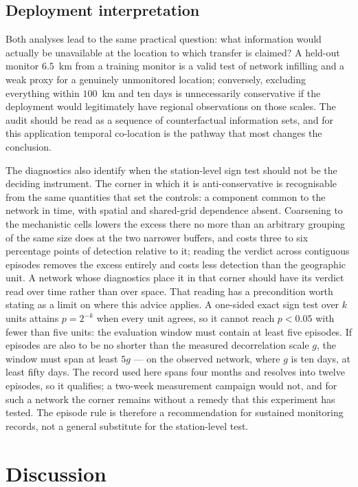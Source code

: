 \subsection{Deployment interpretation}

Both analyses lead to the same practical question: what information would actually be unavailable
at the location to which transfer is claimed? A held-out monitor $6.5$~km from a training monitor
is a valid test of network infilling and a weak proxy for a genuinely unmonitored location;
conversely, excluding everything within $100$~km and ten days is unnecessarily conservative if the
deployment would legitimately have regional observations on those scales. The audit should be read
as a sequence of counterfactual information sets, and for this application temporal co-location is
the pathway that most changes the conclusion.

The diagnostics also identify when the station-level sign test should not be the deciding
instrument. The corner in which it is anti-conservative is recognisable from the same quantities
that set the controls: a component common to the network in time, with spatial and shared-grid
dependence absent. Coarsening to the mechanistic cells lowers the excess there no more than an
arbitrary grouping of the same size does at the two narrower buffers, and costs three to six
percentage points of detection relative to it; reading the verdict across contiguous episodes
removes the excess entirely and costs less detection than the geographic unit. A network whose
diagnostics place it in that corner should have its verdict read over time rather than over space.
That reading has a precondition worth stating as a limit on where this advice applies. A
one-sided exact sign test over $k$ units attains $p=2^{-k}$ when every unit agrees, so it cannot
reach $p<0.05$ with fewer than five units: the evaluation window must contain at least five
episodes. If episodes are also to be no shorter than the measured decorrelation scale $g$, the
window must span at least $5g$ --- on the observed network, where $g$ is ten days, at least
fifty days. The record used here spans four months and resolves into twelve episodes, so it
qualifies; a two-week measurement campaign would not, and for such a network the corner remains
without a remedy that this experiment has tested. The episode rule is therefore a recommendation
for sustained monitoring records, not a general substitute for the station-level test.


\section{Discussion}

